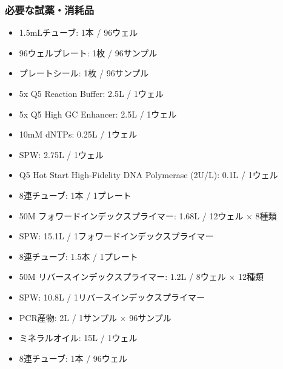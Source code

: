 \documentclass[titlepage,10pt,a4paper,uplatex]{jsbook}
\begin{document}
\subsubsection{必要な試薬・消耗品}
\begin{itemize}
\item 1.5mLチューブ: 1本 / 96ウェル
\item 96ウェルプレート: 1枚 / 96サンプル
\item プレートシール: 1枚 / 96サンプル
\item 5x Q5 Reaction Buffer: 2.5{\textmu}L / 1ウェル
\item 5x Q5 High GC Enhancer: 2.5{\textmu}L / 1ウェル
\item 10mM dNTPs: 0.25{\textmu}L / 1ウェル
\item SPW: 2.75{\textmu}L / 1ウェル
\item Q5 Hot Start High-Fidelity DNA Polymerase (2U/{\textmu}L): 0.1{\textmu}L / 1ウェル
\item 8連チューブ: 1本 / 1プレート
\item 50{\textmu}M フォワードインデックスプライマー: 1.68{\textmu}L / 12ウェル × 8種類
\item SPW: 15.1{\textmu}L / 1フォワードインデックスプライマー
\item 8連チューブ: 1.5本 / 1プレート
\item 50{\textmu}M リバースインデックスプライマー: 1.2{\textmu}L / 8ウェル × 12種類
\item SPW: 10.8{\textmu}L / 1リバースインデックスプライマー
\item PCR産物: 2{\textmu}L / 1サンプル × 96サンプル
\item ミネラルオイル: 15{\textmu}L / 1ウェル
\item 8連チューブ: 1本 / 96ウェル
\end{itemize}
\end{document}
